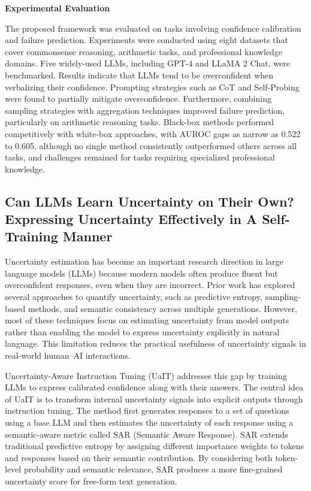 \textbf{Experimental Evaluation}

The proposed framework was evaluated on tasks involving confidence calibration and failure prediction. Experiments were conducted using eight datasets that cover commonsense reasoning, arithmetic tasks, and professional knowledge domains. Five widely-used LLMs, including GPT-4 and LLaMA 2 Chat, were benchmarked. Results indicate that LLMs tend to be overconfident when verbalizing their confidence. Prompting strategies such as CoT and Self-Probing were found to partially mitigate overconfidence. Furthermore, combining sampling strategies with aggregation techniques improved failure prediction, particularly on arithmetic reasoning tasks. Black-box methods performed competitively with white-box approaches, with AUROC gaps as narrow as 0.522 to 0.605, although no single method consistently outperformed others across all tasks, and challenges remained for tasks requiring specialized professional knowledge.



\subsection{Can LLMs Learn Uncertainty on Their Own? Expressing Uncertainty Effectively in A Self-Training Manner}
Uncertainty estimation has become an important research direction in large language models (LLMs) because modern models often produce fluent but overconfident responses, even when they are incorrect. Prior work has explored several approaches to quantify uncertainty, such as predictive entropy, sampling-based methods, and semantic consistency across multiple generations. However, most of these techniques focus on estimating uncertainty from model outputs rather than enabling the model to express uncertainty explicitly in natural language. This limitation reduces the practical usefulness of uncertainty signals in real-world human–AI interactions.

Uncertainty-Aware Instruction Tuning (UaIT) addresses this gap by training LLMs to express calibrated confidence along with their answers. The central idea of UaIT is to transform internal uncertainty signals into explicit outputs through instruction tuning. The method first generates responses to a set of questions using a base LLM and then estimates the uncertainty of each response using a semantic-aware metric called SAR (Semantic Aware Response). SAR extends traditional predictive entropy by assigning different importance weights to tokens and responses based on their semantic contribution. By considering both token-level probability and semantic relevance, SAR produces a more fine-grained uncertainty score for free-form text generation.

